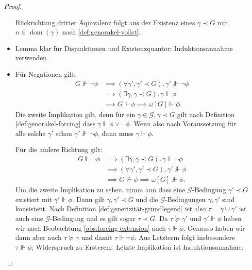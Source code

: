 \documentclass[nofonts]{uebung}
\theoremstyle{definition}
\DeclareMathOperator{\dom}{dom}
\begin{document}
\begin{proof}
\begin{itemize}
            Rückrichtung dritter Äquivalenz folgt aus der Existenz eines $\gamma\prec G$ mit $n\in\dom(\gamma)$ nach \ref{def:genorakel-vollst}.
        \item Lemma klar für Disjunktionen und Existenzquantor: Induktionsannahme verwenden.
        \item Für Negationen gilt: 
            \begin{align*}
                G\not\Vdash \neg\phi &\implies (\forall \gamma', \gamma'\prec G).\,\gamma'\not\Vdash \neg\phi\\
                                     &\implies (\exists \gamma, \gamma\prec G).\,\gamma\Vdash \phi\\
                                     &\implies G\Vdash\phi \implies \omega[G]\Vdash \phi.
            \end{align*}
            Die zweite Implikation gilt, denn für ein $\gamma\in \mathcal G, \gamma\prec G$ gilt nach Definition \ref{def:genorakel-forcing} dass $\gamma\Vdash \phi\lor \neg \phi$.
            Wenn also nach Voraussetzung für alle solche $\gamma'$ schon $\gamma'\not\Vdash \neg\phi$, dann muss $\gamma\Vdash \phi$.

            Für die andere Richtung gilt:
            \begin{align*}
                G\Vdash \neg\phi &\implies (\exists \gamma, \gamma\prec G).\,\gamma\Vdash \neg\phi\\
                                     &\implies (\forall \gamma', \gamma'\prec G).\,\gamma'\not\Vdash \phi\\
                                     &\implies G\not\Vdash\phi \implies \omega[G]\not\Vdash \phi.
            \end{align*}
            Um die zweite Implikation zu sehen, nimm ann dass eine $\mathcal G$-Bedingung $\gamma'\prec G$ existiert mit $\gamma'\Vdash\phi$.
            Dann gilt $\gamma, \gamma'\prec G$ und die $\mathcal G$-Bedingungen $\gamma, \gamma'$ sind konsistent.
            Nach Definition \ref{def:generizität-grundlegend} ist also $\tau=\gamma\cup \gamma'$ ist auch eine $\mathcal G$-Bedingung und es gilt sogar $\tau\prec G$.
            Da $\tau\succeq\gamma'$ und $\gamma'\Vdash\phi$ haben wir nach Beobachtung \ref{obs:forcing-extension} auch $\tau\Vdash\phi$.
            Genauso haben wir dann aber auch $\tau\succeq\gamma$ und damit $\tau\Vdash \neg\phi$. Aus Letzterm folgt insbesondere $\tau\not\Vdash\phi$; Widerspruch zu Ersterem. Letzte Implikation ist Induktionsannahme. \qedhere
    \end{itemize}
\end{proof}
\end{document}
